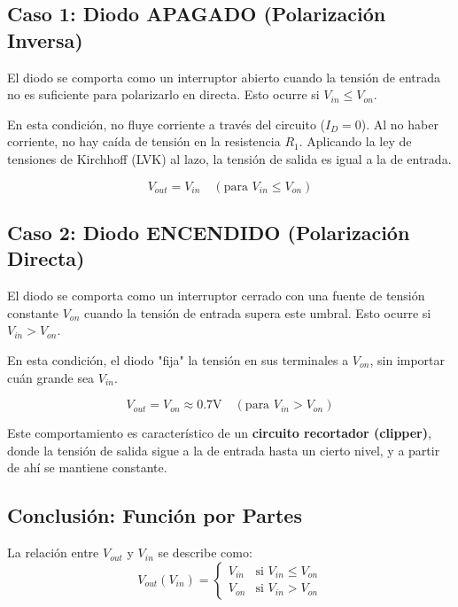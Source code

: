\documentclass[12pt, a4paper]{article}
\begin{document}
\subsection*{Caso 1: Diodo APAGADO (Polarización Inversa)}

El diodo se comporta como un interruptor abierto cuando la tensión de entrada no es suficiente para polarizarlo en directa. Esto ocurre si $V_{in} \le V_{on}$.

En esta condición, no fluye corriente a través del circuito ($I_D = 0$). Al no haber corriente, no hay caída de tensión en la resistencia $R_1$. Aplicando la ley de tensiones de Kirchhoff (LVK) al lazo, la tensión de salida es igual a la de entrada.

\begin{equation}
    V_{out} = V_{in} \quad (\text{para } V_{in} \le V_{on})
\end{equation}

\subsection*{Caso 2: Diodo ENCENDIDO (Polarización Directa)}

El diodo se comporta como un interruptor cerrado con una fuente de tensión constante $V_{on}$ cuando la tensión de entrada supera este umbral. Esto ocurre si $V_{in} > V_{on}$.

En esta condición, el diodo "fija" la tensión en sus terminales a $V_{on}$, sin importar cuán grande sea $V_{in}$.

\begin{equation}
    V_{out} = V_{on} \approx 0.7\text{V} \quad (\text{para } V_{in} > V_{on})
\end{equation}

Este comportamiento es característico de un \textbf{circuito recortador (clipper)}, donde la tensión de salida sigue a la de entrada hasta un cierto nivel, y a partir de ahí se mantiene constante.

\subsection*{Conclusión: Función por Partes}
La relación entre $V_{out}$ y $V_{in}$ se describe como:
\begin{equation}
    V_{out}(V_{in}) = 
    \begin{cases} 
        V_{in} & \text{si } V_{in} \le V_{on} \\
        V_{on} & \text{si } V_{in} > V_{on}
    \end{cases}
\end{equation}
\end{document}
